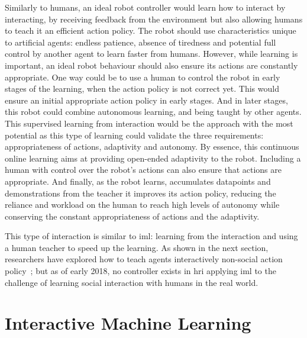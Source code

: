  Similarly to humans, an ideal robot controller would learn how to interact by interacting, by receiving feedback from the environment but also allowing humans to teach it an efficient action policy. The robot should use characteristics unique to artificial agents: endless patience, absence of tiredness and potential full control by another agent to learn faster from humans. However, while learning is important, an ideal robot behaviour should also ensure its actions are constantly appropriate. One way could be to use a human to control the robot in early stages of the learning, when the action policy is not correct yet. This would ensure an initial appropriate action policy in early stages. And in later stages, this robot could combine autonomous learning, and being taught by other agents.
  This supervised learning from interaction would be the approach with the most potential as this type of learning could validate the three requirements: appropriateness of actions, adaptivity and autonomy. By essence, this continuous online learning aims at providing open-ended adaptivity to the robot. Including a human with control over the robot's actions can also ensure that actions are appropriate. And finally, as the robot learns, accumulates datapoints and demonstrations from the teacher it improves its action policy, reducing the reliance and workload on the human to reach high levels of autonomy while conserving the constant appropriateness of actions and the adaptivity. 

 This type of interaction is similar to \gls{iml}: learning from the interaction and using a human teacher to speed up the learning. As shown in the next section, researchers have explored how to teach agents interactively non-social action policy~\citep{scheutz2017spoken,cakmak2010designing}; but as of early 2018, no controller exists in \gls{hri} applying \gls{iml} to the challenge of learning social interaction with humans in the real world.
  
\section{Interactive Machine Learning} \label{sec:back_iml}

